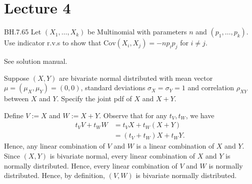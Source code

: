 \section{Lecture 4}

\newcommand{\corrr}{\text{Corr}}
\newcommand{\covv}{\text{Cov}}


\begin{exercise} BH.7.65 Let $(X_1, \ldots, X_k)$ be Multinomial with parameters $n$ and $(p_1, \ldots, p_k)$. Use indicator r.v.s to show that $\covv(X_i, X_j) = -n p_i p_j$ for $i \neq j$.

\begin{solution}
See solution manual.
\end{solution}
\end{exercise}


\begin{exercise}
Suppose $(X,Y)$ are bivariate normal distributed with mean vector $\mu = (\mu_X, \mu_Y) = (0,0)$, standard deviations $\sigma_X = \sigma_Y = 1$ and correlation $\rho_{XY}$ between $X$ and $Y$. Specify the joint pdf of $X$ and $X + Y$.
\begin{solution}
Define $V := X$ and $W := X + Y$. Observe that for any $t_V, t_W$, we have
\begin{align}
    t_V V + t_W W &= t_V X + t_W (X + Y) \\
    &= (t_V + t_W) X + t_W Y.
\end{align}
Hence, any linear combination of $V$ and $W$ is a linear combination of $X$ and $Y$. Since $(X,Y)$ is bivariate normal, every linear combination of $X$ and $Y$ is normally distributed. Hence, every linear combination of $V$ and $W$ is normally distributed. Hence, by definition, $(V,W)$ is bivariate normally distributed.


\end{solution}
\end{exercise}
